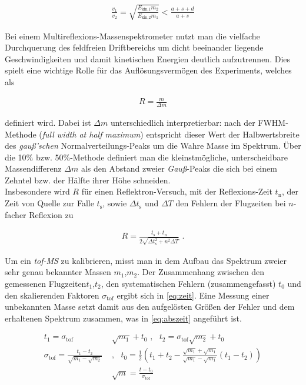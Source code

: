 \documentclass[numbers=noenddot,a4paper,notitlepage,twoside,BCOR15mm]{scrartcl}
\newcommand{\ix}[1]{_\text{#1}}
\newcommand{\tilt}[1]{\textit{#1}}
\begin{document}
		\begin{align}
			\frac{v\ix{1}}{v\ix{2}}=\sqrt{\frac{E\ix{kin,1}m\ix{2}}{E\ix{kin,2}m\ix{1}}}<\frac{a+s+d}{a+s} \label{eq:speicher}
		\end{align}

		Bei einem Multireflexions-Massenspektrometer nutzt man die vielfache Durchquerung des feldfreien Driftbereichs um dicht beeinander liegende Geschwindigkeiten und damit kinetischen Energien deutlich aufzutrennen. Dies spielt eine wichtige Rolle für das Auflösungsvermögen des Experiments, welches als

			\begin{align}
				R=\frac{m}{\Delta m} \label{eq:aufloes}
			\end{align}

		definiert wird. Dabei ist $\Delta m$ unterschiedlich interpretierbar: nach der FWHM-Methode (\tilt{full width at half maximum}) entspricht dieser Wert der Halbwertsbreite des \tilt{gauß'schen} Normalverteilungs-Peaks um die Wahre Masse im Spektrum. Über die 10\% bzw. 50\%-Methode definiert man die kleinstmögliche, unterscheidbare Massendifferenz $\Delta m$ als den Abstand zweier \tilt{Gauß}-Peaks die sich bei einem Zehntel bzw. der Hälfte ihrer Höhe schneiden.\\
		Insbesondere wird $R$ für einen Reflektron-Versuch, mit der Reflexions-Zeit $t\ix{n}$, der Zeit von Quelle zur Falle $t\ix{s}$, sowie $\Delta t\ix{s}$ und $\Delta T$ den Fehlern der Flugzeiten bei $n$-facher Reflexion zu

			\begin{align}
				R=\frac{t\ix{s}+t\ix{n}}{2\sqrt{\Delta t\ix{s}^2+n^2\Delta T}}\,\, . \label{eq:fehler}
			\end{align}

		Um ein \tilt{tof-MS} zu kalibrieren, misst man in dem Aufbau das Spektrum zweier sehr genau bekannter Massen $m\ix{1}$,$m\ix{2}$. Der Zusammenhang zwischen den gemessenen Flugzeiten$t\ix{1}$,$t\ix{2}$, den systematischen Fehlern (zusammengefasst) $t\ix{0}$ und den skalierenden Faktoren $\sigma\ix{tof}$ ergibt sich in \autoref{eq:zeit}. Eine Messung einer unbekannten Masse setzt damit aus den aufgelösten Größen der Fehler und dem erhaltenen Spektrum zusammen, was in \autoref{eq:abszeit} angeführt ist.

			\begin{align}
				t\ix{1}=\sigma\ix{tof}&\sqrt{m\ix{1}}+t\ix{0}\,\,, \,\,\,\, t\ix{2}=\sigma\ix{tof}\sqrt{m\ix{2}}+t\ix{0} \label{eq:zeit}\\
				\sigma\ix{tof}=\frac{t\ix{1}-t\ix{2}}{\sqrt{m\ix{1}-\sqrt{m\ix{2}}}}\,\,& , \,\,\,\, t\ix{0}=\frac{1}{2}\left(t\ix{1}+t\ix{2}-\frac{\sqrt{m\ix{1}}+\sqrt{m\ix{1}}}{\sqrt{m\ix{1}}-\sqrt{m\ix{1}}}\left(t\ix{1}-t\ix{2}\right)\right) \nonumber \\
				&\sqrt{m}=\frac{t-t\ix{0}}{\sigma\ix{tof}} \label{eq:abszeit}
			\end{align}
\end{document}
